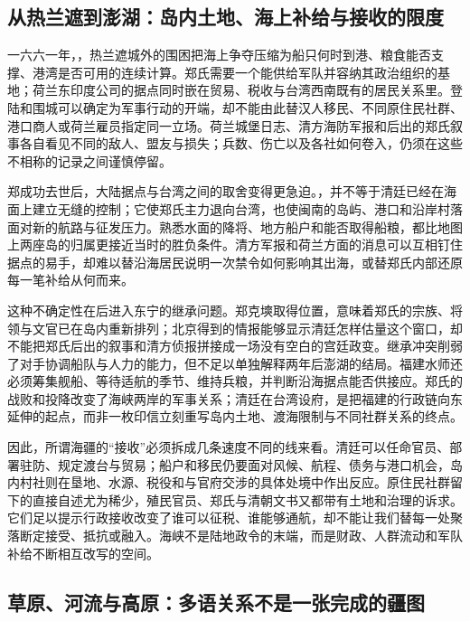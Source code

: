 \subsection{从热兰遮到澎湖：岛内土地、海上补给与接收的限度}

一六六一年，，热兰遮城外的围困把海上争夺压缩为船只何时到港、粮食能否支撑、港湾是否可用的连续计算。郑氏需要一个能供给军队并容纳其政治组织的基地；荷兰东印度公司的据点同时嵌在贸易、税收与台湾西南既有的居民关系里。登陆和围城可以确定为军事行动的开端，却不能由此替汉人移民、不同原住民社群、港口商人或荷兰雇员指定同一立场。荷兰城堡日志、清方海防军报和后出的郑氏叙事各自看见不同的敌人、盟友与损失；兵数、伤亡以及各社如何卷入，仍须在这些不相称的记录之间谨慎停留。

郑成功去世后，大陆据点与台湾之间的取舍变得更急迫。，并不等于清廷已经在海面上建立无缝的控制；它使郑氏主力退向台湾，也使闽南的岛屿、港口和沿岸村落面对新的航路与征发压力。熟悉水面的降将、地方船户和能否取得船粮，都比地图上两座岛的归属更接近当时的胜负条件。清方军报和荷兰方面的消息可以互相钉住据点的易手，却难以替沿海居民说明一次禁令如何影响其出海，或替郑氏内部还原每一笔补给从何而来。

这种不确定性在后进入东宁的继承问题。郑克塽取得位置，意味着郑氏的宗族、将领与文官已在岛内重新排列；北京得到的情报能够显示清廷怎样估量这个窗口，却不能把郑氏后出的叙事和清方侦报拼接成一场没有空白的宫廷政变。继承冲突削弱了对手协调船队与人力的能力，但不足以单独解释两年后澎湖的结局。福建水师还必须筹集舰船、等待适航的季节、维持兵粮，并判断沿海据点能否供接应。郑氏的战败和投降改变了海峡两岸的军事关系；清廷在台湾设府，是把福建的行政链向东延伸的起点，而非一枚印信立刻重写岛内土地、渡海限制与不同社群关系的终点。

因此，所谓海疆的“接收”必须拆成几条速度不同的线来看。清廷可以任命官员、部署驻防、规定渡台与贸易；船户和移民仍要面对风候、航程、债务与港口机会，岛内村社则在垦地、水源、税役和与官府交涉的具体处境中作出反应。原住民社群留下的直接自述尤为稀少，殖民官员、郑氏与清朝文书又都带有土地和治理的诉求。它们足以提示行政接收改变了谁可以征税、谁能够通航，却不能让我们替每一处聚落断定接受、抵抗或融入。海峡不是陆地政令的末端，而是财政、人群流动和军队补给不断相互改写的空间。

\subsection{草原、河流与高原：多语关系不是一张完成的疆图}

